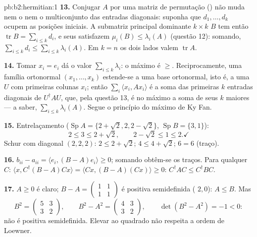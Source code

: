 \begin{solution}{pb:b2:hermitian:1}
\textbf{13.} Conjugar $A$ por uma matriz de permutação ()
não muda nem o  nem o multiconjunto das entradas
diagonais: suponha que $d_1, \dots, d_k$ ocupem as posições iniciais.
A submatriz principal dominante $k\times k$ $B$ tem então
$\operatorname{tr} B = \sum_{i\leq k}d_i$, e seus 
satisfazem $\mu_i(B) \leq \lambda_i(A)$ (questão 12): somando,
$\sum_{i\leq k}d_i \leq \sum_{i\leq k}\lambda_i(A)$. Em $k =
n$ os dois lados valem $\operatorname{tr} A$.

\textbf{14.} Tomar $x_i = e_i$ dá o valor
$\sum_{i\leq k}\lambda_i$: o máximo é $\geq$. Reciprocamente, uma
família ortonormal $(x_1, \dots, x_k)$ estende-se a uma
base ortonormal, isto é, a uma $U$  com primeiras colunas
$x_i$; então $\sum_i\langle x_i, Ax_i\rangle$ é a soma das
primeiras $k$ entradas diagonais de $U^\dagger AU$, que, pela questão
13, é no máximo a soma de seus $k$ maiores  ---
a saber, $\sum_{i\leq k}\lambda_i(A)$. Segue o princípio do máximo
de Ky Fan.

\textbf{15.} Entrelaçamento ($\operatorname{Sp}A = \{2+\sqrt2, 2,
2-\sqrt2\}$, $\operatorname{Sp}B = \{3, 1\}$):
\[
2 \leq 3 \leq 2 + \sqrt2,
\qquad
2 - \sqrt2 \leq 1 \leq 2 . \checkmark
\]
Schur com diagonal $(2,2,2)$: $2 \leq 2+\sqrt2$; $4 \leq 4 +
\sqrt2$; $6 = 6$ (traço). \checkmark

\textbf{16.} $b_{ii} - a_{ii} = \langle e_i, (B-A)e_i\rangle
\geq 0$; somando obtêm-se os traços. Para qualquer $C$: $\langle x,
C^\dagger(B - A)Cx\rangle = \langle Cx, (B-A)(Cx)\rangle \geq
0$: $C^\dagger AC \leq C^\dagger BC$.

\textbf{17.} $A \geq 0$ é claro; $B - A = \begin{pmatrix} 1 & 1\\
1 & 1\end{pmatrix}$ é positiva semidefinida ( $2,
0$): $A \leq B$. Mas
\[
B^2 = \begin{pmatrix} 5 & 3\\ 3 & 2\end{pmatrix},
\qquad
B^2 - A^2 = \begin{pmatrix} 4 & 3\\ 3 & 2\end{pmatrix},
\qquad \det(B^2 - A^2) = -1 < 0 :
\]
não é positiva semidefinida. Elevar ao quadrado não respeita a
ordem de Loewner.


\end{solution}
